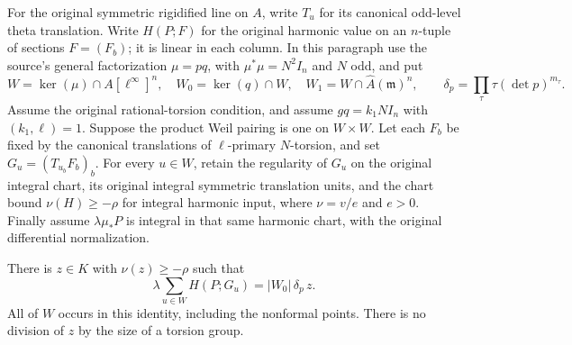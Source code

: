 For the original symmetric rigidified line on $A$, write $T_u$ for its
canonical odd-level theta translation.  Write $H(P;F)$ for the original
harmonic value on an $n$-tuple of sections $F=(F_b)$; it is linear in
each column.  In this paragraph use the source's general factorization
$\mu=pq$, with $\mu^*\mu=N^2I_n$ and $N$ odd, and put
\[
 W=\ker(\mu)\cap A[\ell^\infty]^n,\quad
 W_0=\ker(q)\cap W,\quad
 W_1=W\cap\widehat A(\mathfrak m)^n,
 \qquad \delta_p=\prod_\tau\tau(\det p)^{m_\tau}.
\]
Assume the original rational-torsion condition, and assume
$gq=k_1N I_n$ with $(k_1,\ell)=1$.  Suppose the product Weil pairing is
one on $W\times W$.  Let each $F_b$ be fixed by the canonical translations
of $\ell$-primary $N$-torsion, and set $G_u=(T_{u_b}F_b)_b$.
For every $u\in W$, retain the regularity of $G_u$ on the original
integral chart, its original integral symmetric translation units, and
the chart bound $\nu(H)\geq-\rho$ for integral harmonic input, where
$\nu=v/e$ and $e>0$.  Finally assume $\lambda\mu_*P$ is integral in
that same harmonic chart, with the original differential normalization.

\begin{theorem}\label{thm:full-primary-theta-trace}
There is $z\in K$ with $\nu(z)\geq-\rho$ such that
\begin{equation}\label{eq:full-primary-theta-trace}
       \lambda\sum_{u\in W}H(P;G_u)=|W_0|\,\delta_p\,z.
\end{equation}
All of $W$ occurs in this identity, including the nonformal points.
There is no division of $z$ by the size of a torsion group.
\end{theorem}

